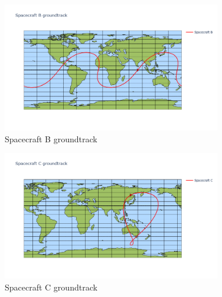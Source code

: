 \begin{hwkProblem}{2}{}
	

	\hwkPart

	\begin{figure}[H]
		\begin{center}
			\includegraphics[width=0.85\textwidth]{./images/s02b.png}
		\end{center}
		\caption{Spacecraft B groundtrack}\label{fig:s02b}
	\end{figure}

	

	\hwkPart

	\begin{figure}[H]
		\begin{center}
			\includegraphics[width=0.85\textwidth]{./images/s02c.png}
		\end{center}
		\caption{Spacecraft C groundtrack}\label{fig:s02c}
	\end{figure}

	

	\hwkPart


\end{hwkProblem}
